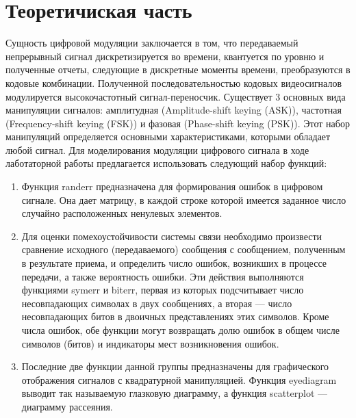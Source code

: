 \documentclass[10pt,a4paper]{report}
\begin{document}
\section{Теоретичиская часть}
Сущность цифровой модуляции заключается в том, что передаваемый непрерывный сигнал дискретизируется во времени, квантуется по уровню и полученные отчеты, следующие в дискретные моменты времени, преобразуются в кодовые комбинации. Полученной последовательностью кодовых видеосигналов модулируется высокочастотный сигнал-переносчик.
Существует 3 основных вида манипуляции сигналов: амплитудная (Amplitude-shift keying (ASK)), частотная (Frequency-shift keying (FSK)) и фазовая (Phase-shift keying (PSK)). Этот набор манипуляций определяется основными характеристиками, которыми обладает любой сигнал. Для моделирования модуляции цифрового сигнала в ходе лаботаторной работы предлагается использовать следующий набор функций:
\begin{enumerate}
\item Функция randerr предназначена для формирования ошибок в цифровом сигнале. Она дает матрицу, в каждой строке которой имеется заданное число случайно расположенных ненулевых элементов.
\item Для оценки помехоустойчивости системы связи необходимо произвести сравнение исходного (передаваемого) сообщения с сообщением, полученным в результате приема, и определить число ошибок, возникших в процессе передачи, а также вероятность ошибки. Эти действия выполняются функциями symerr и biterr, первая из которых подсчитывает число несовпадающих символах в двух сообщениях, а вторая — число несовпадающих битов в двоичных представлениях этих символов. Кроме числа ошибок, обе функции могут возвращать долю ошибок в общем числе символов (битов) и индикаторы мест возникновения ошибок.
\item Последние две функции данной группы предназначены для графического отображения сигналов с квадратурной манипуляцией. Функция eyediagram выводит так называемую глазковую диаграмму, а функция scatterplot — диаграмму рассеяния.
\end{enumerate}
\end{document}
